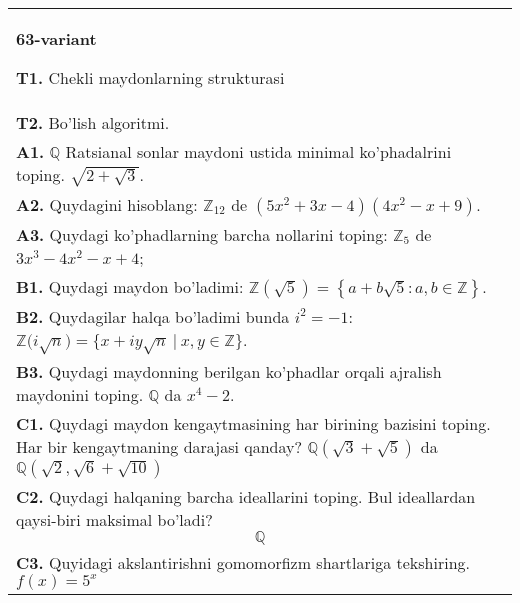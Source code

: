 \documentclass{article}
\begin{document}
\begin{tabular}{m{17cm}}
\textbf{63-variant}
\newline

\textbf{T1.} Chekli maydonlarning strukturasi \\
\textbf{T2.} Bo'lish algoritmi. \\
\textbf{A1.} \(\mathbb{Q}\) Ratsianal sonlar maydoni ustida minimal ko'phadalrini toping.
\(\sqrt{2 + \sqrt{3}}\). \\
\textbf{A2.} Quydagini hisoblang:
\(\mathbb{Z}_{12}\) de \(\left( 5x^{2} + 3x - 4 \right)\left( 4x^{2} - x + 9 \right)\). \\
\textbf{A3.} Quydagi ko'phadlarning barcha nollarini toping:
\(\mathbb{Z}_{5}\) de \(3x^{3} - 4x^{2} - x + 4\); \\
\textbf{B1.} Quydagi maydon bo'ladimi:
\(\mathbb{Z}\left( \sqrt{5} \right) = \left\{ a + b\sqrt{5}:a,b \in \mathbb{Z} \right\}\). \\
\textbf{B2.} Quydagilar halqa bo'ladimi bunda \(i^{2} = - 1\):
\(\mathbb{Z(}i\sqrt{n}) = \{ x + iy\sqrt{n}\ |\ x,y \in \mathbb{Z\}}\). \\
\textbf{B3.} Quydagi maydonning berilgan ko'phadlar orqali ajralish maydonini toping.
\(\mathbb{Q}\) da \(x^{4} - 2\). \\
\textbf{C1.} Quydagi maydon kengaytmasining har birining bazisini toping. Har bir kengaytmaning darajasi qanday?
\(\mathbb{Q}\left( \sqrt{3} + \sqrt{5} \right)\) da \(\mathbb{Q}\left( \sqrt{2},\sqrt{6} + \sqrt{10} \right)\) \\
\textbf{C2.} Quydagi halqaning barcha ideallarini toping. Bul ideallardan qaysi-biri maksimal bo'ladi?
\[\mathbb{Q}\] \\
\textbf{C3.} Quyidagi akslantirishni gomomorfizm shartlariga tekshiring. \(f(x) = 5^{x}\) \\

\end{tabular}
\vspace{1cm}
\end{document}
